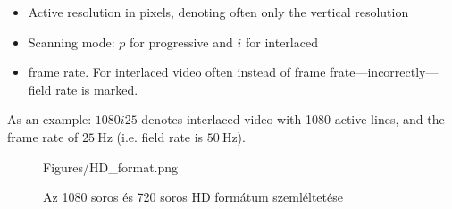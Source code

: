 \begin{itemize}
\begin{itemize}
\item Active resolution in pixels, denoting often only the vertical resolution
\item Scanning mode: $p$ for progressive and $i$ for interlaced
\item frame rate.
For interlaced video often instead of frame frate---incorrectly---field rate is marked.
\end{itemize}
As an example: $1080i25$ denotes interlaced video with 1080 active lines, and the frame rate of $25~\mathrm{Hz}$ (i.e. field rate is $50~\mathrm{Hz}$).
\begin{figure}[]
	\centering
	\begin{overpic}[width = 1 \columnwidth ]{Figures/HD_format.png}
	\small
	\end{overpic}
	\caption{Az 1080 soros és 720 soros HD formátum szemléltetése}
	\label{Fig:HD_formats}
\end{figure}


\end{itemize}
